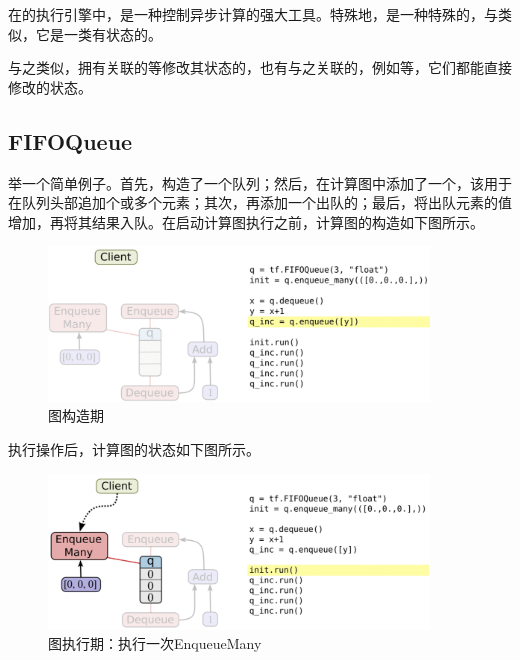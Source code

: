 \begin{content}

在的执行引擎中，是一种控制异步计算的强大工具。特殊地，是一种特殊的，与类似，它是一类有状态的。

与之类似，拥有关联的等修改其状态的，也有与之关联的，例如等，它们都能直接修改的状态。

\subsection{FIFOQueue}

举一个简单例子。首先，构造了一个队列；然后，在计算图中添加了一个，该用于在队列头部追加个或多个元素；其次，再添加一个出队的；最后，将出队元素的值增加，再将其结果入队。在启动计算图执行之前，计算图的构造如下图所示。

\begin{figure}[!h]
\centering
\includegraphics[width=0.9\textwidth]{figures/py-queue-example-1.png}
\caption{图构造期}
 \label{fig:py-queue-example-1}
\end{figure}

执行操作后，计算图的状态如下图所示。

\begin{figure}[!h]
\centering
\includegraphics[width=0.9\textwidth]{figures/py-queue-example-2.png}
\caption{图执行期：执行一次EnqueueMany}
 \label{fig:py-queue-example-2}
\end{figure}



\end{content}
